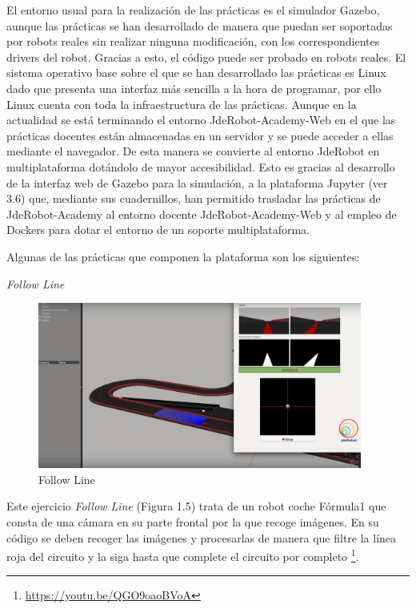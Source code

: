 El entorno usual para la realización de las prácticas es el simulador Gazebo, aunque las prácticas se han desarrollado de manera que puedan ser soportadas por robots reales sin realizar ninguna modificación, con los correspondientes drivers del robot. Gracias a esto, el código puede ser probado en robots reales. El sistema operativo base sobre el que se han desarrollado las prácticas es Linux dado que presenta una interfaz más sencilla a la hora de programar, por ello Linux cuenta con toda la infraestructura de las prácticas. 
Aunque en la actualidad se está terminando el entorno JdeRobot-Academy-Web en el que las prácticas docentes están almacenadas en un servidor y se puede acceder a ellas mediante el navegador. De esta manera se convierte al entorno JdeRobot en multiplataforma dotándolo de mayor accesibilidad. Esto es gracias al desarrollo de la interfaz web de Gazebo para la simulación, a la plataforma Jupyter (ver 3.6) que, mediante sus cuadernillos, han permitido trasladar las prácticas de JdeRobot-Academy al entorno docente JdeRobot-Academy-Web y al empleo de Dockers para dotar el entorno de un soporte multiplataforma.

Algunas de las prácticas que componen la plataforma son los siguientes:

\hspace{0.4\linewidth}
\textit{Follow Line}

\begin{figure}[H]
  \begin{center}
    \includegraphics[width=0.95\textwidth]{figures/followline.png}
		\caption{Follow Line}
		\label{fig.followline}
		\end{center}
\end{figure}

Este ejercicio \textit{Follow Line} (Figura 1.5) trata de un robot coche Fórmula1 que consta de una cámara en su parte frontal por la que recoge imágenes. En su código se deben recoger las imágenes y procesarlas de manera que filtre la línea roja del circuito y la siga hasta que complete el circuito por completo \footnote{\url{https://youtu.be/QGO9oaoBVoA}}.


